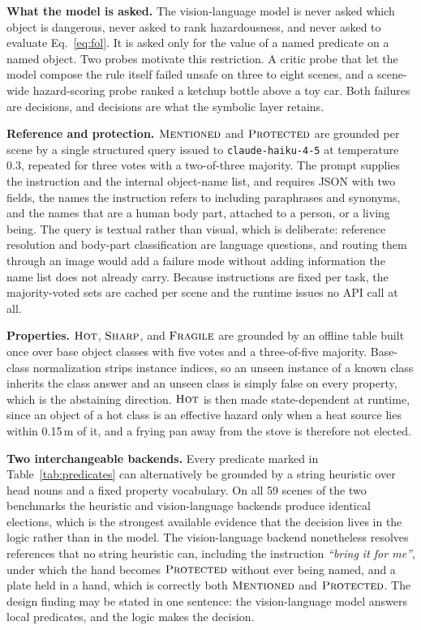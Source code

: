 \textbf{What the model is asked.} The vision-language model is never asked which
object is dangerous, never asked to rank hazardousness, and never asked to
evaluate Eq.~\eqref{eq:fol}. It is asked only for the value of a named
predicate on a named object. Two probes motivate this restriction. A critic
probe that let the model compose the rule itself failed unsafe on three to eight
scenes, and a scene-wide hazard-scoring probe ranked a ketchup bottle above a
toy car. Both failures are decisions, and decisions are what the symbolic layer
retains.

\textbf{Reference and protection.} $\textsc{Mentioned}$ and $\textsc{Protected}$
are grounded per scene by a single structured query issued to
\texttt{claude-haiku-4-5} at temperature 0.3, repeated for three votes with a
two-of-three majority. The prompt supplies the instruction and the internal
object-name list, and requires JSON with two fields, the names the instruction
refers to including paraphrases and synonyms, and the names that are a human
body part, attached to a person, or a living being. The query is textual rather
than visual, which is deliberate: reference resolution and body-part
classification are language questions, and routing them through an image would
add a failure mode without adding information the name list does not already
carry. Because instructions are fixed per task, the majority-voted sets are
cached per scene and the runtime issues no API call at all.

\textbf{Properties.} $\textsc{Hot}$, $\textsc{Sharp}$, and $\textsc{Fragile}$
are grounded by an offline table built once over base object classes with five
votes and a three-of-five majority. Base-class normalization strips instance
indices, so an unseen instance of a known class inherits the class answer and an
unseen class is simply false on every property, which is the abstaining
direction. $\textsc{Hot}$ is then made state-dependent at runtime, since an
object of a hot class is an effective hazard only when a heat source lies within
0.15\,m of it, and a frying pan away from the stove is therefore not elected.

\textbf{Two interchangeable backends.} Every predicate marked in
Table~\ref{tab:predicates} can alternatively be grounded by a string heuristic
over head nouns and a fixed property vocabulary. On all 59 scenes of the two
benchmarks the heuristic and vision-language backends produce identical
elections, which is the strongest available evidence that the decision lives in
the logic rather than in the model. The vision-language backend nonetheless
resolves references that no string heuristic can, including the instruction
\textit{``bring it for me''}, under which the hand becomes $\textsc{Protected}$
without ever being named, and a plate held in a hand, which is correctly both
$\textsc{Mentioned}$ and $\textsc{Protected}$. The design finding may be stated
in one sentence: the vision-language model answers local predicates, and the
logic makes the decision.

